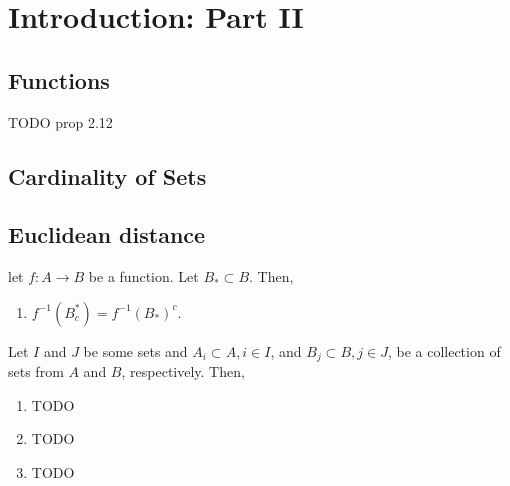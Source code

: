 \chapter{Introduction: Part II}%
\label{cha:Introduction: Part II}
\section{Functions}%
\label{sec:Functions}
\begin{proposition}[]
    \label{prop:2.12}
    TODO prop 2.12
\end{proposition}

\section{Cardinality of Sets}%
\label{sec:Cardinality of Sets}

\section{Euclidean distance}%
\label{sec:Euclidean distance}

\begin{proposition}[]
    \label{prop:2.4}
    let $f: A \to B$ be a function. Let $B_* \subset B$. Then,
    \begin{enumerate}[label=(\alph*)]
        \item $f^{-1}(B_{c}^{*}) = f^{-1}(B_*)^{c}.$
    \end{enumerate}
    Let $I$ and $J$ be some sets and $A_i \subset A, i \in  I$, and $B_j \subset B, j \in  J$, be a
    collection of sets from $A$ and $B$, respectively. Then,
    \begin{enumerate}[resume*]
        \item TODO
        \item TODO
        \item TODO
    \end{enumerate}
\end{proposition}

